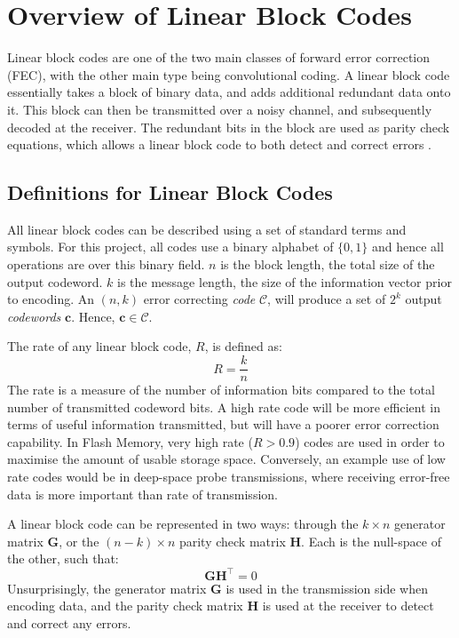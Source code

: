 \documentclass[11pt]{article}
\numberwithin{equation}{subsection}
\begin{document}
\section{Overview of Linear Block Codes}

Linear block codes are one of the two main classes of forward error correction (FEC), with the other main type being convolutional coding. A linear block code essentially takes a block of binary data, and adds additional redundant data onto it. This block can then be transmitted over a noisy channel, and subsequently decoded at the receiver. The redundant bits in the block are used as parity check equations, which allows a linear block code to both detect and correct errors \cite{tse2005fundamentals,proakis2001digital,haykin2008communication}.

\subsection{Definitions for Linear Block Codes} \label{3.1:definitions}
All linear block codes can be described using a set of standard terms and symbols. For this project, all codes use a binary alphabet of $\{0,1\}$ and hence all operations are over this binary field. $n$ is the block length, the total size of the output codeword. $k$ is the message length, the size of the information vector prior to encoding. An $(n,k)$ error correcting \textit{code} $\mathcal{C}$, will produce a set of $2^k$ output \textit{codewords} $\mathbf{c}$. Hence, $\mathbf{c} \in \mathcal{C}$. 

The rate of any linear block code, $R$, is defined as: 
\begin{equation}
R = \dfrac{k}{n}
\end{equation}
The rate is a measure of the number of information bits compared to the total number of transmitted codeword bits. A high rate code will be more efficient in terms of useful information transmitted, but will have a poorer error correction capability. In Flash Memory, very high rate ($R > 0.9$) codes are used in order to maximise the amount of usable storage space. Conversely, an example use of low rate codes would be in deep-space probe transmissions, where receiving error-free data is more important than rate of transmission.

A linear block code can be represented in two ways: through the $k \times n$ generator matrix $\mathbf{G}$, or the $(n - k) \times n$ parity check matrix $\mathbf{H}$. Each is the null-space of the other, such that:
\begin{equation}
\mathbf{G H}^\top = 0
\end{equation}
Unsurprisingly, the generator matrix $\mathbf{G}$ is used in the transmission side when encoding data, and the parity check matrix $\mathbf{H}$ is used at the receiver to detect and correct any errors.
\end{document}
